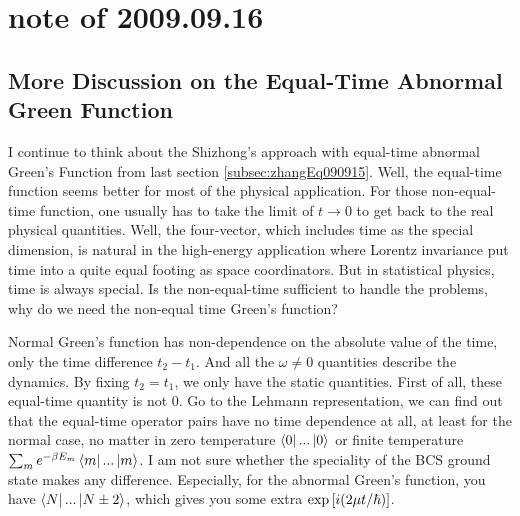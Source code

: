 \section{note of 2009.09.16}
\subsection{More Discussion on the Equal-Time Abnormal Green Function}
I continue to think about the Shizhong's approach \cite{ZhangThesis} with equal-time abnormal Green's Function from last section \ref{subsec:zhangEq090915}.  Well, the equal-time function seems better for most of the physical application.  For those non-equal-time function, one usually has to take the limit of $t\rightarrow0$ to get back to the real physical quantities. Well, the four-vector, which includes time as the special dimension, is natural in the high-energy application where Lorentz invariance put time into a quite equal footing as space coordinators.  But in statistical physics, time is always special.  Is the non-equal-time sufficient to handle the problems, why do we need the non-equal time Green's function? 

Normal Green's function has non-dependence on the absolute value of the time, only the time difference $t_2-t_1$.  And all the $\omega\neq0$ quantities describe the dynamics.  By fixing $t_2=t_1$, we only have the static quantities.  First of all, these equal-time quantity is not 0.   Go to the Lehmann representation, we can find out that the equal-time operator pairs have no time dependence at all, at least for the normal case, no matter in zero temperature $\left<0\right|...\left|0\right>$ or finite temperature $\sum_m{e^{-\beta{E_m}}}\left<m\right|...\left|m\right>$.  I am not sure whether the speciality of the BCS ground state makes any difference. Especially, for the abnormal Green's function, you have $\left<N\right|...\left|N\pm2\right>$, which gives you some extra $\exp\left[i(2\mu{t}/\hbar)\right]$.
